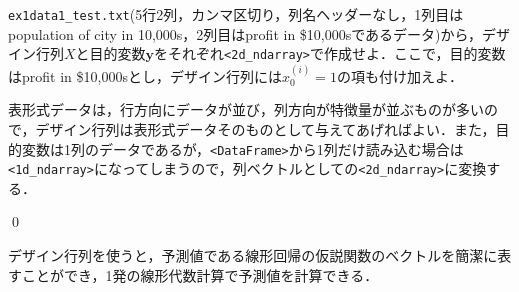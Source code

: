 \begin{qu}\label{qu_lr1}
\texttt{ex1data1\_test.txt}(5行2列，カンマ区切り，列名ヘッダーなし，1列目はpopulation of city in 10,000s，2列目はprofit in \$10,000sであるデータ)から，デザイン行列$X$と目的変数${\bm y}$をそれぞれ\texttt{<2d\_ndarray>}で作成せよ．ここで，目的変数はprofit in \$10,000sとし，デザイン行列には$x_0^{(i)}=1$の項も付け加えよ．
\end{qu}
\begin{ans}
表形式データは，行方向にデータが並び，列方向が特徴量が並ぶものが多いので，デザイン行列は表形式データそのものとして与えてあげればよい．また，目的変数は1列のデータであるが，\texttt{<DataFrame>}から1列だけ読み込む場合は\texttt{<1d\_ndarray>}になってしまうので，列ベクトルとしての\texttt{<2d\_ndarray>}に変換する．
\begin{cod}[\texttt{lr1.py}]　
}]{code/lr1.py}
\vspace{-10pt}
\begin{lstlisting}
X=
[[1.     6.1101]
 [1.     5.5277]
 [1.     8.5186]
 [1.     7.0032]
 [1.     5.8598]]
type=<class 'numpy.ndarray'>,shape=(5, 2)
y=
[[17.592 ]
 [ 9.1302]
 [13.662 ]
 [11.854 ]
 [ 6.8233]]
type=<class 'numpy.ndarray'>,shape=(5, 1)
\end{lstlisting}
\end{cod}
\vspace{-10pt}
\qed
\end{ans}

デザイン行列を使うと，予測値である線形回帰の仮説関数のベクトルを簡潔に表すことができ，1発の線形代数計算で予測値を計算できる．

